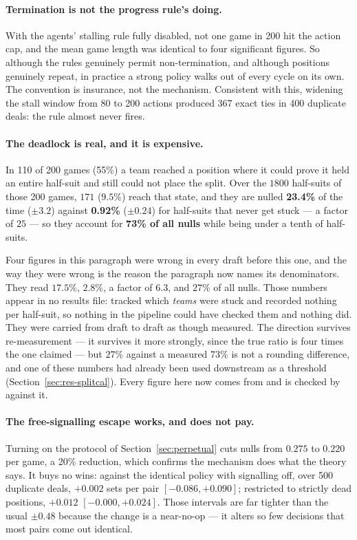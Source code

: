 \documentclass[11pt,a4paper]{article}
\begin{document}
\paragraph{Termination is not the progress rule's doing.} With the agents'
stalling rule fully disabled, not one game in 200 hit the action cap, and the
mean game length was identical to four significant figures. So although the
rules genuinely permit non-termination, and although positions genuinely repeat,
in practice a strong policy walks out of every cycle on its own. The convention
is insurance, not the mechanism. Consistent with this, widening the stall window
from 80 to 200 actions produced 367 exact ties in 400 duplicate deals: the rule
almost never fires.

\paragraph{The deadlock is real, and it is expensive.} In 110 of 200 games
(55\%) a team reached a position where it could prove it held an entire
half-suit and still could not place the split. Over the $1800$ half-suits of
those 200 games, $171$ ($9.5\%$) reach that state, and they are nulled
\textbf{23.4\%} of the time ($\pm 3.2$) against \textbf{0.92\%} ($\pm 0.24$) for
half-suits that never get stuck --- a factor of $25$ --- so they account for
\textbf{73\% of all nulls} while being under a tenth of half-suits.

Four figures in this paragraph were wrong in every draft before this one, and
the way they were wrong is the reason the paragraph now names its denominators.
They read $17.5\%$, $2.8\%$, a factor of $6.3$, and $27\%$ of all nulls. Those
numbers appear in no results file:  tracked which
\emph{teams} were stuck and recorded nothing per half-suit, so nothing in the
pipeline could have checked them and nothing did. They were carried from draft
to draft as though measured. The direction survives re-measurement --- it
survives it more strongly, since the true ratio is four times the one claimed
--- but $27\%$ against a measured $73\%$ is not a rounding difference, and one
of these numbers had already been used downstream as a threshold
(Section~\ref{sec:res-splitcal}). Every figure here now comes from
 and is checked by
 against it.

\paragraph{The free-signalling escape works, and does not pay.} Turning on the
protocol of Section~\ref{sec:perpetual} cuts nulls from $0.275$ to $0.220$ per
game, a 20\% reduction, which confirms the mechanism does what the theory says.
It buys no wins: against the identical policy with signalling off, over 500
duplicate deals, $+0.002$ sets per pair $[-0.086, +0.090]$; restricted to
strictly dead positions, $+0.012$ $[-0.000, +0.024]$. Those intervals are far
tighter than the usual $\pm 0.48$ because the change is a near-no-op --- it alters
so few decisions that most pairs come out identical.
\end{document}
